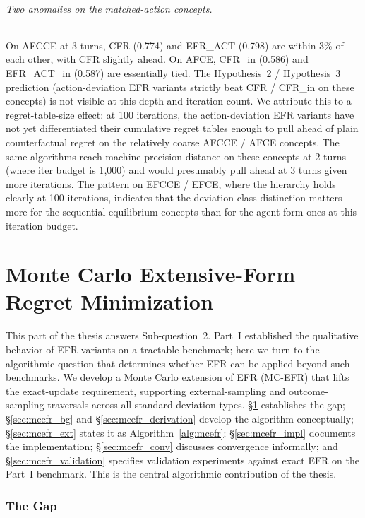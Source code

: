\documentclass[11pt]{article}
\begin{document}
\paragraph{Two anomalies on the matched-action concepts.} On AFCCE at 3 turns, CFR (0.774) and EFR\_ACT (0.798) are within 3\% of each other, with CFR slightly ahead. On AFCE, CFR\_in (0.586) and EFR\_ACT\_in (0.587) are essentially tied. The Hypothesis~2 / Hypothesis~3 prediction (action-deviation EFR variants strictly beat CFR / CFR\_in on these concepts) is not visible at this depth and iteration count. We attribute this to a regret-table-size effect: at 100 iterations, the action-deviation EFR variants have not yet differentiated their cumulative regret tables enough to pull ahead of plain counterfactual regret on the relatively coarse AFCCE / AFCE concepts. The same algorithms reach machine-precision distance on these concepts at 2 turns (where iter budget is 1{,}000) and would presumably pull ahead at 3 turns given more iterations. The pattern on EFCCE / EFCE, where the hierarchy holds clearly at 100 iterations, indicates that the deviation-class distinction matters more for the sequential equilibrium concepts than for the agent-form ones at this iteration budget.

\newpage

\part{Monte Carlo Extensive-Form Regret Minimization}

This part of the thesis answers Sub-question~2. Part~I established the qualitative behavior of EFR variants on a tractable benchmark; here we turn to the algorithmic question that determines whether EFR can be applied beyond such benchmarks. We develop a Monte Carlo extension of EFR (MC-EFR) that lifts the exact-update requirement, supporting external-sampling and outcome-sampling traversals across all standard deviation types. \S\ref{sec:mcefr_gap} establishes the gap; \S\ref{sec:mcefr_bg} and \S\ref{sec:mcefr_derivation} develop the algorithm conceptually; \S\ref{sec:mcefr_ext} states it as Algorithm~\ref{alg:mcefr}; \S\ref{sec:mcefr_impl} documents the implementation; \S\ref{sec:mcefr_conv} discusses convergence informally; and \S\ref{sec:mcefr_validation} specifies validation experiments against exact EFR on the Part~I benchmark. This is the central algorithmic contribution of the thesis.

\section{The Gap}
\label{sec:mcefr_gap}
\end{document}
